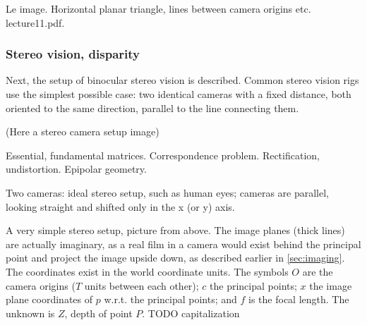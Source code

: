 Le image. Horizontal planar triangle, lines between camera origins etc. lecture11.pdf.

\subsubsection{Stereo vision, disparity}

Next, the setup of binocular stereo vision is described. Common stereo vision rigs use the simplest possible case: two identical cameras with a fixed distance, both oriented to the same direction, parallel to the line connecting them.

(Here a stereo camera setup image)

Essential, fundamental matrices. Correspondence problem. Rectification, undistortion. Epipolar geometry.

Two cameras: ideal stereo setup, such as human eyes; cameras are parallel, looking straight and shifted only in the x (or y) axis.

{A very simple stereo setup, picture from above. The image planes (thick lines) are actually imaginary, as a real film in a camera would exist behind the principal point and project the image upside down, as described earlier in \ref{sec:imaging}. The coordinates exist in the world coordinate units. The symbols $O$ are the camera origins ($T$ units between each other); $c$ the principal points; $x$ the image plane coordinates of $p$ w.r.t. the principal points; and $f$ is the focal length. The unknown is $Z$, depth of point $P$. TODO capitalization}

